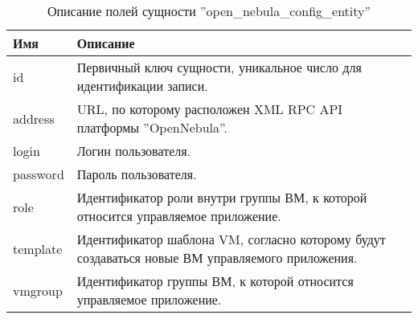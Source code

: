 \begin{table}[hbtp]
    \caption{Описание полей сущности ''open\_nebula\_config\_entity''}
    \begin{tabularx}{\linewidth}{l X}
        \textbf{Имя} & \textbf{Описание} \\
        \hline
        id & Первичный ключ сущности, уникальное число для идентификации записи. \\
        \hline
        address & URL, по которому расположен XML RPC API платформы ''OpenNebula''. \\
        \hline
        login & Логин пользователя. \\
        \hline
        password & Пароль пользователя. \\
        \hline
        role & Идентификатор роли внутри группы ВМ, к которой относится управляемое приложение. \\
        \hline
        template & Идентификатор шаблона VM, согласно которому будут создаваться новые ВМ управляемого приложения. \\
        \hline
        vmgroup & Идентификатор группы ВМ, к которой относится управляемое приложение. \\
    \end{tabularx}
    \label{db-scheme-one}
\end{table}
